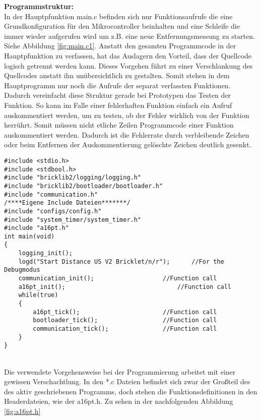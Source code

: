 \textbf{Programmstruktur:}\\
In der Hauptpfunktion main.c befinden sich nur Funktionsaufrufe die eine Grundkonfiguration  für den Mikrocontroller beinhalten und eine Schleife die immer wieder aufgerufen wird um z.B. eine neue Entfernungsmessung zu starten. Siehe Abbildung \ref{fig:main.c1}. Anstatt den gesamten Programmcode in der Hauptpfunktion zu verfassen, hat das Auslagern den Vorteil, dass der Quellcode logisch getrennt werden kann. Dieses Vorgehen führt zu einer Verschlankung des Quellcodes anstatt ihn unübersichtlich zu gestalten. Somit stehen in dem Hauptprogramm nur noch die Aufrufe der separat verfassten Funktionen. Dadurch vereinfacht diese Struktur gerade bei Prototypen das Testen der Funktion. So kann im Falle einer fehlerhaften Funktion einfach ein Aufruf auskommentiert werden, um zu testen, ob der Fehler wirklich von der Funktion herrührt. Somit müssen nicht etliche Zeilen Programmcode einer Funktion auskommentiert werden. Dadurch ist die Fehlerrate durch verbleibende Zeichen oder beim Entfernen der Auskommentierung gelöschte Zeichen deutlich gesenkt.\\
\begin{minipage}{1\textwidth}
\begin{lstlisting}
#include <stdio.h>
#include <stdbool.h>
#include "bricklib2/logging/logging.h"
#include "bricklib2/bootloader/bootloader.h"
#include "communication.h"
/****Eigene Include Dateien*******/
#include "configs/config.h"
#include "system_timer/system_timer.h"
#include "a16pt.h"
int main(void)
{ 
	logging_init(); 
	logd("Start Distance US V2 Bricklet/n/r");  	//For the Debugmodus
	communication_init(); 					//Function call
	a16pt_init(); 								//Function call	
	while(true)
	{
		a16pt_tick(); 						//Function call
		bootloader_tick(); 					//Function call
		communication_tick(); 				//Function call	
	}
}
\end{lstlisting}
\label{fig:main.c1}
\end{minipage}\\
Die verwendete Vorgehensweise bei der Programmierung arbeitet mit einer gewissen Verschachtlung. In den *.c Dateien befindet sich zwar der Großteil des des aktiv geschriebenen Programms, doch stehen die Funktionsdefinitionen in den Headerdateien, wie der a16pt.h. Zu sehen in der nachfolgenden Abbildung \ref{fig:a16pt.h}\\
